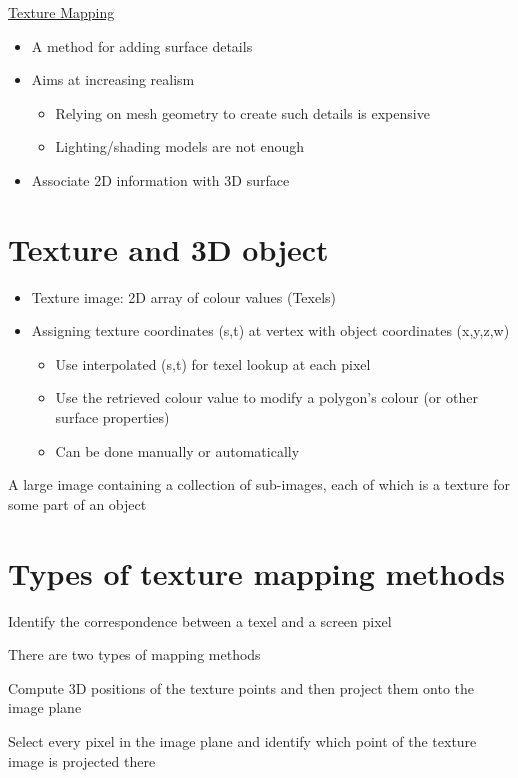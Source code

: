 \documentclass{article}[18pt]
\begin{document}
\begin{center}
	\underline{\huge Texture Mapping}
\end{center}
\begin{itemize}
	\item A method for adding surface details
	\item Aims at increasing realism
	\begin{itemize}
		\item Relying on mesh geometry to create such details is expensive
		\item Lighting/shading models are not enough
	\end{itemize}
	\item Associate 2D information with 3D surface
\end{itemize}
\section{Texture and 3D object}
\begin{itemize}
	\item Texture image: 2D array of colour values (Texels)
	\item Assigning texture coordinates (s,t) at vertex with object coordinates (x,y,z,w)
	\begin{itemize}
		\item Use interpolated (s,t) for texel lookup at each pixel
		\item Use the retrieved colour value to modify a polygon's colour (or other surface properties)
		\item Can be done manually or automatically
	\end{itemize}
\end{itemize}
\begin{definition}
A large image containing a collection of sub-images, each of which is a texture for some part of an object
\end{definition}
\section{Types of texture mapping methods}
\begin{definition}[Mapping]
Identify the correspondence between a texel and a screen pixel
\end{definition}
There are two types of mapping methods
\begin{definition}
Compute 3D positions of the texture points and then project them onto the image plane
\end{definition}
\begin{definition}
Select every pixel in the image plane and identify which point of the texture image is projected there
\end{definition}
\end{document}
